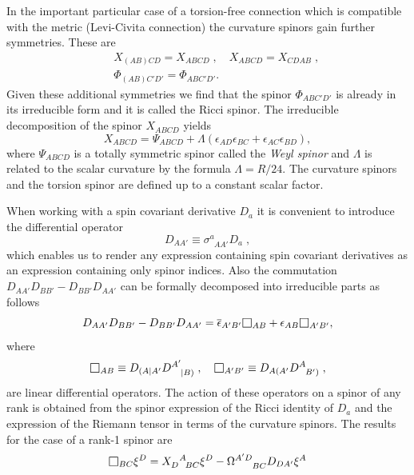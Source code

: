 \documentclass[final,3p,times,twocolumn]{elsarticle}
\newcommand{\DAl}{\raise -0.4mm \hbox{\large$\Box$}}
\begin{document}
In the important particular case of a torsion-free connection which is compatible with the metric (Levi-Civita connection) the curvature spinors gain further symmetries. These are
\begin{eqnarray*}
&& X_{(AB)CD}=X_{ABCD}\;,\quad
X_{ABCD}=X_{CDAB}\;,\\
&& \Phi_{(AB)C'D'}=\Phi_{ABC'D'}. 
\end{eqnarray*}
Given these additional symmetries we find that the spinor $\Phi_{ABC'D'}$ is already in its 
irreducible form and it is called the Ricci spinor. The irreducible decomposition of the spinor $X_{ABCD}$ yields 
\begin{equation}
 X_{ABCD}=\Psi_{ABCD}+\Lambda(\epsilon_{AD}\epsilon_{BC}+\epsilon_{AC}\epsilon_{BD}),
\end{equation}
where $\Psi_{ABCD}$ is a totally symmetric spinor called the {\em Weyl spinor} and $\Lambda$ is related to the scalar curvature by the formula $\Lambda=R/24$. The curvature spinors and the torsion spinor are defined up to a constant scalar factor.

When working with a spin covariant derivative $D_a$ it is convenient to introduce the differential operator
\begin{equation}
D_{AA'}\equiv\sigma^a_{\phantom{a}AA'}D_a\;, 
\label{eq:d-2-index}
\end{equation}
which enables us to render any expression containing spin covariant derivatives as 
an expression containing only spinor indices. Also the commutation $D_{AA'}D_{BB'}-D_{BB'}D_{AA'}$ 
can be formally decomposed into irreducible parts as follows
\begin{equation}
D_{AA'}D_{BB'}-D_{BB'}D_{AA'}=\overline{\epsilon}_{A'B'}\DAl_{AB}+\epsilon_{AB}\DAl_{A'B'},
\label{eq:covd-box}
\end{equation}
where 
\begin{equation}
\DAl_{AB}\equiv D_{(A|A'}D^{A'}_{\phantom{A'}|B)}\;,\quad
\DAl_{A'B'}\equiv D_{A(A'}D^{A}_{\phantom{A}B')}\;, 
\end{equation}
are linear differential operators. 
The action of these operators on a spinor of any rank is obtained 
from the spinor expression of the Ricci identity of $D_a$ and 
the expression of the Riemann tensor in terms of the curvature spinors. 
The results for the case of a rank-1 spinor are 
\begin{equation}
\DAl_{BC}\xi^D=X_{D\phantom{A}BC}^{\phantom{D}A}\xi^D-
\Omega^{A'D}_{\phantom{A'D}BC}D_{DA'}\xi^A
\label{eq:expand-box}
\end{equation}
\end{document}
